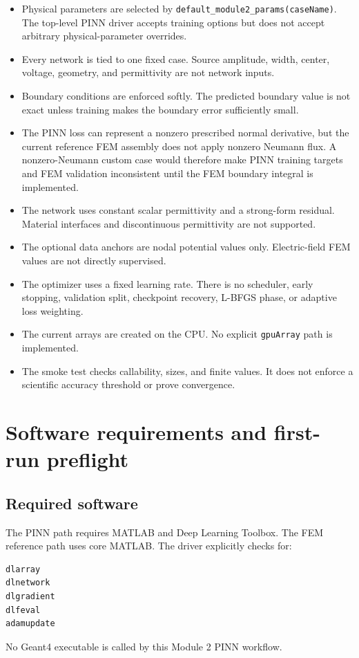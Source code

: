 \documentclass[11pt]{article}
\begin{document}
\begin{itemize}[leftmargin=*]
  \item Physical parameters are selected by \texttt{default\_module2\_params(caseName)}. The top-level PINN driver accepts training options but does not accept arbitrary physical-parameter overrides.
  \item Every network is tied to one fixed case. Source amplitude, width, center, voltage, geometry, and permittivity are not network inputs.
  \item Boundary conditions are enforced softly. The predicted boundary value is not exact unless training makes the boundary error sufficiently small.
  \item The PINN loss can represent a nonzero prescribed normal derivative, but the current reference FEM assembly does not apply nonzero Neumann flux. A nonzero-Neumann custom case would therefore make PINN training targets and FEM validation inconsistent until the FEM boundary integral is implemented.
  \item The network uses constant scalar permittivity and a strong-form residual. Material interfaces and discontinuous permittivity are not supported.
  \item The optional data anchors are nodal potential values only. Electric-field FEM values are not directly supervised.
  \item The optimizer uses a fixed learning rate. There is no scheduler, early stopping, validation split, checkpoint recovery, L-BFGS phase, or adaptive loss weighting.
  \item The current arrays are created on the CPU. No explicit \texttt{gpuArray} path is implemented.
  \item The smoke test checks callability, sizes, and finite values. It does not enforce a scientific accuracy threshold or prove convergence.
\end{itemize}

\section{Software requirements and first-run preflight}

\subsection{Required software}

The PINN path requires MATLAB and Deep Learning Toolbox. The FEM reference path uses core MATLAB. The driver explicitly checks for:
\begin{lstlisting}[style=projectmatlab]
dlarray
dlnetwork
dlgradient
dlfeval
adamupdate
\end{lstlisting}
No Geant4 executable is called by this Module 2 PINN workflow.
\end{document}
